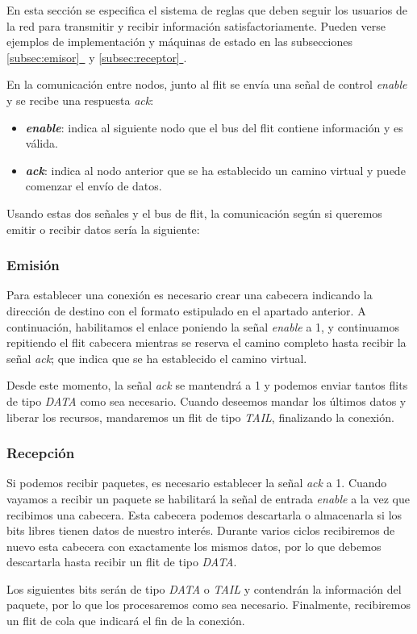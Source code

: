En esta sección se especifica el sistema de reglas que deben seguir los usuarios de la red para transmitir y recibir información satisfactoriamente. Pueden verse ejemplos de implementación y máquinas de estado en las subsecciones \hyperref[subsec:emisor]{\ref{subsec:emisor}~} y \hyperref[subsec:receptor]{\ref{subsec:receptor} }.

En la comunicación entre nodos, junto al flit se envía una señal de control \textit{enable} y se recibe una respuesta \textit{ack}:
\begin{itemize}[noitemsep]
    \item \textbf{\textit{enable}}: indica al siguiente nodo que el bus del flit contiene información y es válida.
    \item \textbf{\textit{ack}}: indica al nodo anterior que se ha establecido un camino virtual y puede comenzar el envío de datos.
\end{itemize}

Usando estas dos señales y el bus de flit, la comunicación según si queremos emitir o recibir datos sería la siguiente:

\subsubsection{Emisión}

Para establecer una conexión es necesario crear una cabecera indicando la dirección de destino con el formato estipulado en el apartado anterior. A continuación, habilitamos el enlace poniendo la señal \textit{enable} a 1, y continuamos repitiendo el flit cabecera mientras se reserva el camino completo hasta recibir la señal \textit{ack}; que indica que se ha establecido el camino virtual.

Desde este momento, la señal \textit{ack} se mantendrá a 1 y podemos enviar tantos flits de tipo \textit{DATA} como sea necesario. Cuando deseemos mandar los últimos datos y liberar los recursos, mandaremos un flit de tipo \textit{TAIL}, finalizando la conexión.

\subsubsection{Recepción}

Si podemos recibir paquetes, es necesario establecer la señal \textit{ack} a 1. Cuando vayamos a recibir un paquete se habilitará la señal de entrada \textit{enable} a la vez que recibimos una cabecera. Esta cabecera podemos descartarla o almacenarla si los bits libres tienen datos de nuestro interés. Durante varios ciclos recibiremos de nuevo esta cabecera con exactamente los mismos datos, por lo que debemos descartarla hasta recibir un flit de tipo \textit{DATA}.

Los siguientes bits serán de tipo \textit{DATA} o \textit{TAIL} y contendrán la información del paquete, por lo que los procesaremos como sea necesario. Finalmente, recibiremos un flit de cola que indicará el fin de la conexión.
